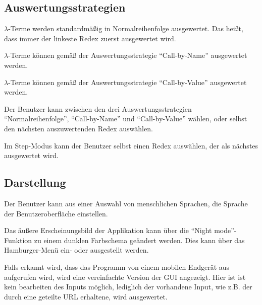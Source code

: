\documentclass[parskip=full,11pt,twoside]{scrartcl}
\begin{document}
\subsection{Auswertungsstrategien}

$\lambda$-Terme werden standardmäßig in Normalreihenfolge ausgewertet. Das heißt, dass immer der linkeste Redex zuerst ausgewertet wird.

$\lambda$-Terme können gemäß der Auswertungsstrategie \enquote{Call-by-Name} ausgewertet werden.

$\lambda$-Terme können gemäß der Auswertungsstrategie \enquote{Call-by-Value} ausgewertet werden.

Der Benutzer kann zwischen den drei Auswertungsstrategien \enquote{Normalreihenfolge}, \enquote{Call-by-Name} und \enquote{Call-by-Value} wählen, oder selbst den nächsten auszuwertenden Redex auswählen.

Im Step-Modus kann der Benutzer selbst einen Redex auswählen, der als nächstes ausgewertet wird.




\subsection{Darstellung}

Der Benutzer kann aus einer Auswahl von menschlichen Sprachen, die Sprache der Benutzeroberfläche einstellen.

Das äußere Erscheinungsbild der Applikation kann über die \enquote{Night mode}-Funktion zu einem dunklen Farbschema geändert werden. Dies kann über das Hamburger-Menü ein- oder ausgestellt werden.

Falls erkannt wird, dass das Programm von einem mobilen Endgerät aus aufgerufen wird, wird eine vereinfachte Version der GUI angezeigt. Hier ist ist kein bearbeiten des Inputs möglich, lediglich der vorhandene Input, wie z.B. der durch eine geteilte URL erhaltene, wird ausgewertet.
\end{document}
